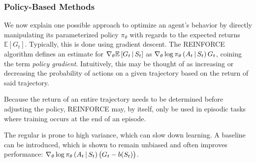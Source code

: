 \subsubsection{Policy-Based Methods}
We now explain one possible approach to optimize an agent's behavior by directly manipulating its parameterized policy $\pi_\theta$ with regards to the expected returns $\mathbb{E}\left[G_t\right]$. Typically, this is done using gradient descent. The REINFORCE algorithm \cite{reinforce} defines an estimate for $\nabla_\theta \mathbb{E}\left[G_t \,\middle|\, S_t \right]$ as $\nabla_\theta \log \pi_\theta\left(A_t \,\middle|\, S_t\right) G_t$, coining the term \textit{policy gradient}. Intuitively, this may be thought of as increasing or decreasing the probability of actions on a given trajectory based on the return of said trajectory.

Because the return of an entire trajectory needs to be determined before adjusting the policy, REINFORCE may, by itself, only be used in episodic tasks where training occurs at the end of an episode.

The regular is prone to high variance, which can slow down learning. A baseline can be introduced, which is shown to remain unbiased and often improves performance: $\nabla_\theta \log \pi_\theta\left(A_t \,\middle|\, S_t\right) \left(G_t - b(S_t)\right)$.